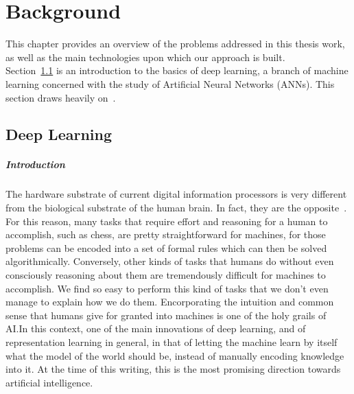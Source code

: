 \documentclass[../main.tex]{subfiles}
\begin{document}
    \chapter{Background}\label{chap:background}

    This chapter provides an overview of the problems addressed in this thesis work, as well as the main technologies upon which our approach is built. \\
    Section~\ref{sec:deeplearning} is an introduction to the basics of deep learning, a branch of machine learning concerned with the study of Artificial Neural Networks (ANNs).
    This section draws heavily on~\cite{Goodfellow-et-al-2016}.

    \section{Deep Learning}\label{sec:deeplearning}

    \paragraph{Introduction}
    The hardware substrate of current digital information processors is very different from the biological substrate of the human brain.
    In fact, they are the opposite~\cite{anusuya2010superficial}.
    For this reason, many tasks that require effort and reasoning for a human to accomplish, such as chess, are pretty straightforward for machines,
    for those problems can be encoded into a set of formal rules which can then be solved algorithmically.
    Conversely, other kinds of tasks that humans do without even consciously reasoning about them are tremendously difficult for machines to accomplish.
    We find so easy to perform this kind of tasks that we don't even manage to explain how we do them. Encorporating the intuition
    and common sense that humans give for granted into machines is one of the holy grails of AI.\@ In this context, one of the main
    innovations of deep learning, and of representation learning in general, in that of letting the machine learn by itself what the
    model of the world should be, instead of manually encoding knowledge into it. At the time of this writing, this is the most promising
    direction towards artificial intelligence.
\end{document}
